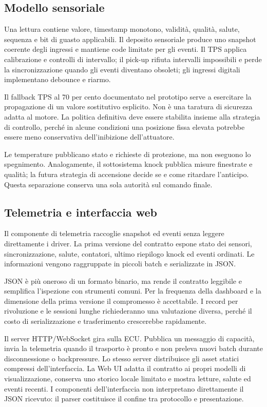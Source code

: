 \documentclass{article}
\begin{document}
\subsection{Modello sensoriale}

Una lettura contiene valore, timestamp monotono, validità, qualità, salute,
sequenza e bit di guasto applicabili. Il deposito sensoriale produce uno
snapshot coerente degli ingressi e mantiene code limitate per gli eventi. Il
TPS applica calibrazione e controlli di intervallo; il pick-up rifiuta intervalli
impossibili e perde la sincronizzazione quando gli eventi diventano obsoleti;
gli ingressi digitali implementano debounce e riarmo.

Il fallback TPS al 70 per cento documentato nel prototipo serve a esercitare la
propagazione di un valore sostitutivo esplicito. Non è una taratura di sicurezza
adatta al motore. La politica definitiva deve essere stabilita insieme alla
strategia di controllo, perché in alcune condizioni una posizione fissa elevata
potrebbe essere meno conservativa dell'inibizione dell'attuatore.

Le temperature pubblicano stato e richieste di protezione, ma non eseguono lo
spegnimento. Analogamente, il sottosistema knock pubblica misure finestrate e
qualità; la futura strategia di accensione decide se e come ritardare
l'anticipo. Questa separazione conserva una sola autorità sul comando finale.

\subsection{Telemetria e interfaccia web}

Il componente di telemetria raccoglie snapshot ed eventi senza leggere
direttamente i driver. La prima versione del contratto espone stato dei sensori,
sincronizzazione, salute, contatori, ultimo riepilogo knock ed eventi ordinati.
Le informazioni vengono raggruppate in piccoli batch e serializzate in JSON.

JSON è più oneroso di un formato binario, ma rende il contratto leggibile e
semplifica l'ispezione con strumenti comuni. Per la frequenza della dashboard e
la dimensione della prima versione il compromesso è accettabile. I record per
rivoluzione e le sessioni lunghe richiederanno una valutazione diversa, perché
il costo di serializzazione e trasferimento crescerebbe rapidamente.

Il server HTTP/WebSocket gira sulla ECU. Pubblica un messaggio di capacità,
invia la telemetria quando il trasporto è pronto e non preleva nuovi batch
durante disconnessione o backpressure. Lo stesso server distribuisce gli asset
statici compressi dell'interfaccia. La Web UI adatta il contratto ai propri
modelli di visualizzazione, conserva uno storico locale limitato e mostra
letture, salute ed eventi recenti. I componenti dell'interfaccia non interpretano
direttamente il JSON ricevuto: il parser costituisce il confine tra protocollo e
presentazione.
\end{document}
